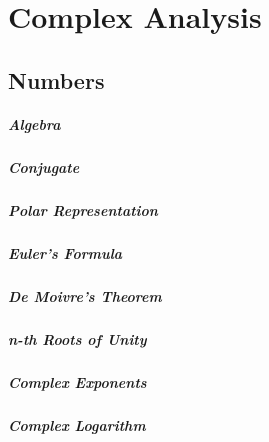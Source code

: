 \chapter{Complex Analysis}

\section{Numbers}

\paragraph{Algebra}

\paragraph{Conjugate}

\paragraph{Polar Representation}

\paragraph{Euler's Formula}

\paragraph{De Moivre's Theorem}

\paragraph{n-th Roots of Unity}

\paragraph{Complex Exponents}

\paragraph{Complex Logarithm}